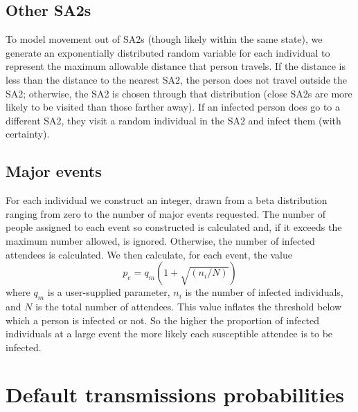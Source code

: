 \documentclass{grattan}
\begin{document}
\subsection{Other SA2s}

To model movement out of SA2s (though likely within the same state),
we generate an exponentially distributed random variable
for each individual to represent the maximum allowable distance that person
travels. If the distance is less than the distance to the nearest SA2, the person
does not travel outside the SA2; otherwise, the SA2 is chosen through that distribution
(close SA2s are more likely to be visited than those farther away).
 If an infected person does go to a different SA2, they visit a random individual in the SA2 and
 infect them (with certainty).

\subsection{Major events}
For each individual we construct an integer, drawn from a beta distribution ranging from zero
to the number of major events requested. The number of people assigned to each event so constructed
is calculated and, if it exceeds the maximum number allowed, is ignored. Otherwise, the number of
infected attendees is calculated. We then calculate, for each event, the value
\[p_e = q_m(1 + \sqrt{(n_i / N)}) \]
where \(q_m\) is a user-supplied parameter, \(n_i\) is the number of infected individuals, and \(N\)
is the total number of attendees. This value inflates the threshold below which a person is infected
or not. So the higher the proportion of infected individuals at a large event the more likely each
susceptible attendee is to be infected.


\section{Default transmissions probabilities}
\end{document}
